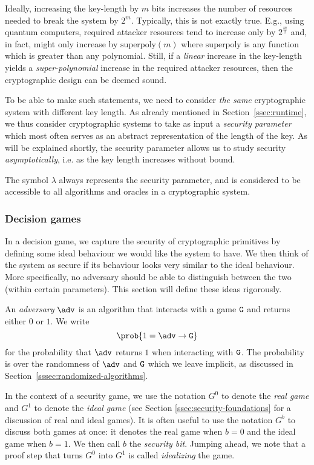 Ideally, increasing the key-length by $m$ bits increases the number of resources needed to break the system by $2^m$. Typically, this is not exactly true. E.g., using quantum computers, required attacker resources tend to increase only by $2^{\frac{m}{2}}$ and, in fact, might only increase by $\text{superpoly}(m)$ where $\text{superpoly}$ is any function which is greater than any polynomial. Still, if a \emph{linear} increase in the key-length yields a \emph{super-polynomial} increase in the required attacker resources, then the cryptographic design can be deemed sound.

To be able to make such statements, we need to consider \emph{the same} cryptographic system with different key length. As already mentioned in Section~\ref{ssec:runtime}, we thus consider cryptographic systems to take as input a \emph{security parameter} which most often serves as an abstract representation of the length of the key. As will be explained shortly, the security parameter allows us to study security \emph{asymptotically}, i.e. as the key length increases without bound.

The symbol $\lambda$ always represents the security parameter, and is considered to be accessible to all algorithms and oracles in a cryptographic system.

\subsubsection{Decision games}\label{sssec:decision-games}
In a decision game, we capture the security of cryptographic primitives by defining some ideal behaviour we would like the system to have. We then think of the system as secure if its behaviour looks very similar to the ideal behaviour. More specifically, no adversary should be able to distinguish between the two (within certain parameters). This section will define these ideas rigorously.

An \emph{adversary} $\adv$ is an algorithm that interacts with a game $\text{\texttt{G}}$ and returns either $0$ or $1$. We write
\[\prob{1=\adv\circ\M{G}}\]
for the probability that $\adv$ returns $1$ when interacting with $\text{\texttt{G}}$. The probability is over the randomness of $\adv$ and $\text{\texttt{G}}$ which we leave implicit, as discussed in Section~\ref{sssec:randomized-algorithms}.

In the context of a security game, we use the notation $G^0$ to denote the \emph{real game} and $G^1$ to denote the \emph{ideal game} (see Section \ref{ssec:security-foundations} for a discussion of real and ideal games). It is often useful to use the notation $G^b$ to discuss both games at once: it denotes the real game when $b=0$ and the ideal game when $b=1$. We then call $b$ the \emph{security bit}. Jumping ahead, we note that a proof step that turns $G^0$ into $G^1$ is called \emph{idealizing} the game.

